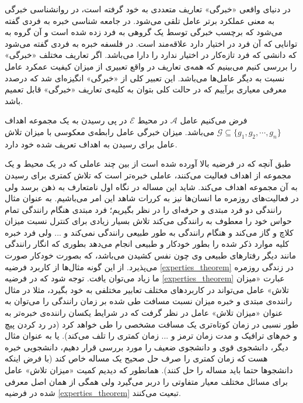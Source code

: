 در دنیای واقعی «خبرگی» تعاریف متعددی به خود گرفته است، در روانشناسی خبرگی به معنی عملکرد برتر عامل تلقی می‌شود. در جامعه شناسی خبره به فردی گفته می‌شود که برچسب خبرگی توسط یک گروهی به فرد زده شده است و آن گروه به توانایی که آن فرد در اختیار دارد علاقه‌مند است. در فلسفه خبره به فردی گفته می‌شود که دانشی که فرد تازه‌کار در اختیار ندارد را دارا می‌باشد. اگر تعاریف مختلف «خبرگی» را بررسی کنیم می‌بینیم که همه‌ی تعاریف در واقع تعبیری از میزان کیفیت عمکرد عامل نسبت به دیگر عامل‌ها می‌باشد. این تعبیر کلی از «خبرگی» انگیزه‌ای شد که درصدد معرفی معیاری برآییم که در حالت کلی بتوان به کلیه‌ی تعاریف «خبرگی» قابل تعمیم باشد.

\begin{hypo}[خبرگی]\setstretch{\thebaselinestretch}\label{experties_theorem}
فرض می‌کنیم عامل $\mathcal{A}$ در محیط $\mathcal{E}$ در پی رسیدن به یک مجموعه اهداف
$\mathcal{G} \subseteq \{g_1, g_2, \cdots, g_n\}$
می‌باشد. میزان خبرگی عامل رابطه‌ی معکوسی با میزان تلاش عامل برای رسیدن به اهداف تعریف شده خود دارد.
\end{hypo}

طبق آنچه که در فرضیه بالا آورده شده است از بین چند عاملی که در یک محیط و یک مجموعه از اهداف فعالیت می‌کنند، عاملی خبره‌تر است که تلاش کمتری برای رسیدن به آن مجموعه اهداف می‌کند. شاید این مساله در نگاه اول نامتعارف به ذهن برسد ولی در فعالیت‌های روزمره ما انسان‌ها نیز به کررات شاهد این امر می‌باشیم. به عنوان مثال رانندگی دو فرد مبتدی و حرفه‌ای را در نظر بگیریم؛ فرد مبتدی هنگام رانندگی تمام حواس خود را معطوف به رانندگی می‌کند تلاش بسیار زیادی برای کنترل نسبت میزان کلاچ و گاز می‌کند و هنگام رانندگی به طور طبیعی رانندگی نمی‌کند و ... ولی فرد خبره کلیه موارد ذکر شده را بطور خودکار و طبیعی انجام می‌دهد بطوری که انگار رانندگی مانند دیگر رفتارهای طبیعی وی چون نفس کشیدن می‌باشد، که بصورت خودکار صورت می‌پذیرد. از این گونه مثال‌ها از کاربرد فرضیه
\ref{experties_theorem}
در زندگی روزمره ما زیاد می‌توان یافت.
توجه شود که در فرضیه
\ref{experties_theorem}
عبارت «میزان تلاش» عامل می‌تواند در کاربردهای مختلف تعابیر مختلفی به خود بگیرد، مثلا در مثال راننده‌ی مبتدی و خبره میزان نسبت مسافت طی شده بر زمان رانندگی را می‌توان به عنوان «میزان تلاش» عامل در نظر گرفت که در شرایط یکسان راننده‌ی خبره‌تر به طور نسبی در زمان کوتاه‌تری یک مسافت مشخصی را طی خواهد کرد (در رد کردن پیچ و خم‌های ترافیک و مدت زمان ترمز و ... زمان کمتری را تلف می‌کند). یا به عنوان مثال دیگر، دانشجوی قوی و دانشجوی ضعیف را مورد بررسی قرار دهیم، دانشجویی خبره هست که زمان کمتری را صرف حل صحیح یک مساله خاص کند (با فرض اینکه دانشجوها حتما باید مساله را حل کنند). همانطور که دیدیم کمیت «میزان تلاش» عامل برای مسائل مختلف معیار متفاوتی را دربر می‌گیرد ولی همگی از همان اصل معرفی شده در فرضیه
\ref{experties_theorem}
تبعیت می‌کنند.


